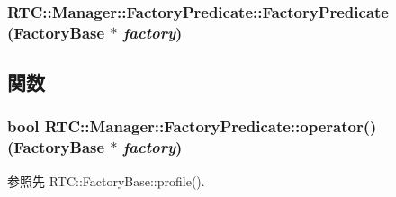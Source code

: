 \subsubsection[{FactoryPredicate}]{\setlength{\rightskip}{0pt plus 5cm}RTC::Manager::FactoryPredicate::FactoryPredicate ({\bf FactoryBase} $\ast$ {\em factory})\hspace{0.3cm}{\ttfamily  [inline]}}\label{classRTC_1_1Manager_1_1FactoryPredicate_a0727638df0c5a930f20c805ccc660a6e}


\subsection{関数}
\subsubsection[{operator()}]{\setlength{\rightskip}{0pt plus 5cm}bool RTC::Manager::FactoryPredicate::operator() ({\bf FactoryBase} $\ast$ {\em factory})\hspace{0.3cm}{\ttfamily  [inline]}}\label{classRTC_1_1Manager_1_1FactoryPredicate_a292a83f4047f23485d4529a3b3e0591d}


参照先 RTC::FactoryBase::profile().

